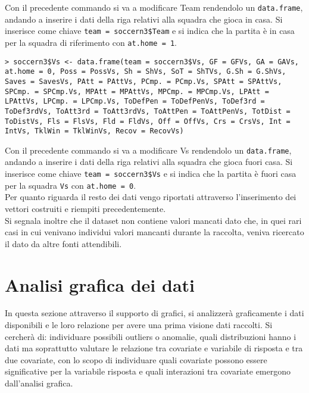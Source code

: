 \bigskip
Con il precedente commando si va a modificare \textsf{Team} rendendolo un \texttt{data.frame}, andando a inserire i dati della riga relativi alla squadra che gioca in casa. Si inserisce come chiave \texttt{team = soccern3\$Team} e si indica che la partita è in casa per la squadra di riferimento con \texttt{at.home = 1}.
\bigskip
\bigskip
\begin{lstlisting}
> soccern3$Vs <- data.frame(team = soccern3$Vs, GF = GFVs, GA = GAVs, at.home = 0, Poss = PossVs, Sh = ShVs, SoT = ShTVs, G.Sh = G.ShVs, Saves = SavesVs, PAtt = PAttVs, PCmp. = PCmp.Vs, SPAtt = SPAttVs, SPCmp. = SPCmp.Vs, MPAtt = MPAttVs, MPCmp. = MPCmp.Vs, LPAtt = LPAttVs, LPCmp. = LPCmp.Vs, ToDefPen = ToDefPenVs, ToDef3rd = ToDef3rdVs, ToAtt3rd = ToAtt3rdVs, ToAttPen = ToAttPenVs, TotDist = ToDistVs, Fls = FlsVs, Fld = FldVs, Off = OffVs, Crs = CrsVs, Int = IntVs, TklWin = TklWinVs, Recov = RecovVs)

\end{lstlisting}
\bigskip
Con il precedente commando si va a modificare \textsf{Vs} rendendolo un \texttt{data.frame}, andando a inserire i dati della riga relativi alla squadra che gioca fuori casa. Si inserisce come chiave \texttt{team = soccern3\$Vs} e si indica che la partita è fuori casa per la squadra \texttt{Vs} con \texttt{at.home = 0}.\\ Per quanto riguarda il resto dei dati vengo riportati attraverso l'inserimento dei vettori costruiti e riempiti precedentemente.\\

Si segnala inoltre che il dataset non contiene valori mancati dato che, in quei rari casi in cui venivano individui valori mancanti durante la raccolta, veniva ricercato il dato da altre fonti attendibili.

\section{Analisi grafica dei dati}
In questa sezione attraverso il supporto di grafici, si analizzerà graficamente i dati disponibili e le loro relazione per avere una prima visione dati raccolti. Si cercherà di: individuare possibili outliers o anomalie, quali distribuzioni hanno i dati ma soprattutto valutare le relazione tra covariate e variabile di risposta e tra due covariate, con lo scopo di individuare quali covariate possono essere significative per la variabile risposta e quali interazioni tra covariate emergono dall'analisi grafica.\\

